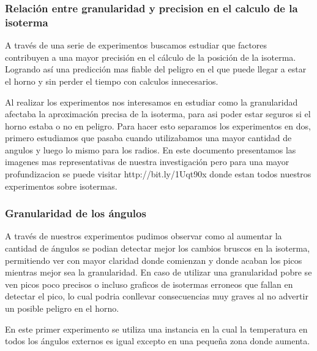 \subsubsection{Relación entre granularidad y precision en el calculo de la isoterma}
A través de una serie de experimentos buscamos estudiar que factores contribuyen a una mayor precisión en el cálculo de la posición de la isoterma. Logrando así una predicción mas fiable del peligro en el que puede llegar a estar el horno y sin perder el tiempo con calculos innecesarios.


Al realizar los experimentos nos interesamos en estudiar como la granularidad afectaba la aproximación precisa de la isoterma, para asi poder estar seguros si el horno estaba o no en peligro. Para hacer esto separamos los experimentos en dos, primero estudiamos que pasaba cuando utilizabamos una mayor cantidad de angulos y luego lo mismo para los radios. En este documento presentamos las imagenes mas representativas de nuestra investigación pero para una mayor profundizacion se puede visitar http://bit.ly/1Uqt90x donde estan todos nuestros experimentos sobre isotermas.

\subsubsection{Granularidad de los ángulos}

A través de nuestros experimentos pudimos observar como al aumentar la cantidad de ángulos se podian detectar mejor los cambios bruscos en la isoterma, permitiendo ver con mayor claridad donde comienzan y donde acaban los picos mientras mejor sea la granularidad. En caso de utilizar una granularidad pobre se ven picos poco precisos o incluso graficos de isotermas erroneos que fallan en detectar el pico, lo cual podria conllevar consecuencias muy graves al no advertir un posible peligro en el horno.

En este primer experimento se utiliza una instancia en la cual la temperatura en todos los ángulos externos es igual excepto en una pequeña zona donde aumenta.

